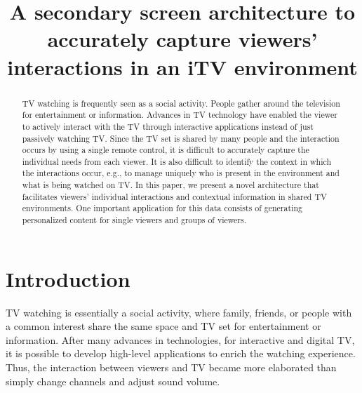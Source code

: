 \documentclass[conference,a4paper]{IEEEtran}
\begin{document}
\title{A secondary screen architecture to accurately capture viewers' interactions in an iTV environment}

\author{
\and
{}
}
\maketitle

\begin{abstract}
TV watching is frequently seen as a social activity. People gather around the television for entertainment or information. Advances in TV technology have enabled the viewer to actively interact with the TV through interactive applications instead of just passively watching TV. Since the TV set is shared by many people and the interaction occurs by using a single remote control, it is difficult to accurately capture the individual needs from each viewer. It is also difficult to identify the context in which the interactions occur, e.g., to manage uniquely who is present in the environment and what is being watched on TV. In this paper, we present a novel architecture that facilitates viewers' individual interactions and contextual information in shared TV environments. One important application for this data consists of generating personalized content for single viewers and groups of viewers.
\end{abstract}

\IEEEpeerreviewmaketitle

\section{Introduction}

TV watching is essentially a social activity, where family, friends, or people with a common interest share the same space and TV set for entertainment or information. After many advances in technologies, for interactive and digital TV, it is possible to develop high-level applications to enrich the watching experience. Thus, the interaction between viewers and TV became more elaborated than simply change channels and adjust sound volume.
\end{document}
